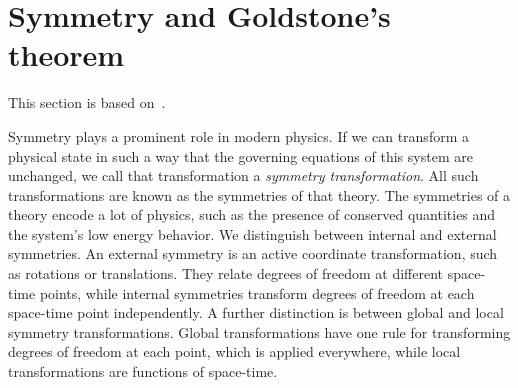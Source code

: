 \section[Symmetry and Goldstone's theorem*]{Symmetry and Goldstone's theorem}
\label{section:symmetry}

This section is based on~\autocite{leeSmoothManifolds2012,peskinIntroductionQuantumField1995,weinbergQuantumTheoryFields1995,weinbergQuantumTheoryFields1996}.

Symmetry plays a prominent role in modern physics.
If we can transform a physical state in such a way that the governing equations of this system are unchanged, we call that transformation a \emph{symmetry transformation}.
All such transformations are known as the symmetries of that theory.
The symmetries of a theory encode a lot of physics, such as the presence of conserved quantities and the system's low energy behavior.
We distinguish between internal and external symmetries.
An external symmetry is an active coordinate transformation, such as rotations or translations.
They relate degrees of freedom at different space-time points, while internal symmetries transform degrees of freedom at each space-time point independently.
A further distinction is between global and local symmetry transformations.
Global transformations have one rule for transforming degrees of freedom at each point, which is applied everywhere, while local transformations are functions of space-time.

